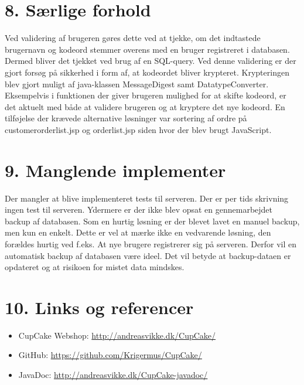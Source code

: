 \documentclass[11pt]{report}
\begin{document}
\chapter*{8. Særlige forhold}
Ved validering af brugeren gøres dette ved at tjekke, om det indtastede brugernavn og kodeord stemmer overens med en bruger registreret i databasen. Dermed bliver det tjekket ved brug af en SQL-query. Ved denne validering er der gjort forsøg på sikkerhed i form af, at kodeordet bliver krypteret. Krypteringen blev gjort muligt af java-klassen MessageDigest samt DatatypeConverter.
Eksempelvis i funktionen der giver brugeren mulighed for at skifte
kodeord, er det aktuelt med både at validere brugeren og at kryptere
det nye kodeord. En tilføjelse der krævede alternative løsninger var sortering af ordre
på customerorderlist.jsp og orderlist.jsp siden hvor der blev brugt
JavaScript.\\

\begingroup
\renewcommand{\cleardoublepage}{}
\renewcommand{\clearpage}{}
\chapter*{9. Manglende implementer}
\endgroup
\noindent
Der mangler at blive implementeret tests til serveren. Der er per tids skrivning ingen test til serveren. 
Ydermere er der ikke blev opsat en gennemarbejdet backup af
databasen. Som en hurtig løsning er der blevet lavet en manuel backup,
men kun en enkelt. Dette er vel at mærke ikke en vedvarende løsning,
den forældes hurtig ved f.eks. At nye brugere registrerer sig på
serveren. Derfor vil en automatisk backup af databasen være ideel. Det
vil betyde at backup-dataen er opdateret og at risikoen for mistet
data mindskes.\\

\begingroup
\renewcommand{\cleardoublepage}{}
\renewcommand{\clearpage}{}
\chapter*{10. Links og referencer}
\endgroup
\begin{itemize}
  \item CupCake Webshop: \url{http://andreasvikke.dk/CupCake/}
  \item GitHub: \url{https://github.com/Krigermus/CupCake/}
  \item JavaDoc: \url{http://andreasvikke.dk/CupCake-javadoc/}
\end{itemize}

 \newpage
\end{document}
